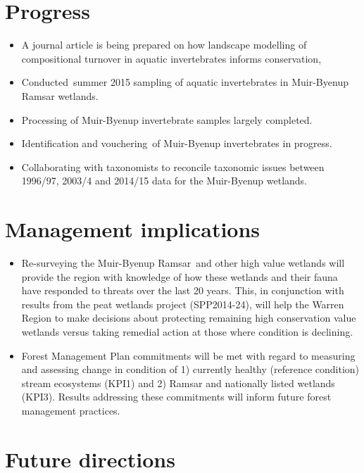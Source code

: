 \documentclass[version=last,
    paper=a4, %
    10pt, %
    usenames,
    dvipsnames,
    oneside, %
    headings=openany, %
    DIV=15 %
]{scrbook}
\begin{document}
\section*{Progress}

\begin{itemize}
\itemsep1pt\parskip0pt
\item
  A journal article is being prepared on how landscape modelling of
  compositional turnover in aquatic invertebrates informs conservation,
\item
  Conducted~summer 2015 sampling of aquatic invertebrates in Muir-Byenup
  Ramsar wetlands.
\item
  Processing of Muir-Byenup invertebrate samples largely completed.
\item
  Identification and vouchering~of Muir-Byenup invertebrates in
  progress.
\item
  Collaborating with taxonomists to reconcile taxonomic issues between
  1996/97, 2003/4 and 2014/15 data for the Muir-Byenup wetlands.
\end{itemize}




\section*{Management implications}

\begin{itemize}
\itemsep1pt\parskip0pt
\item
  Re-surveying the Muir-Byenup Ramsar~and other high value wetlands will
  provide the region with knowledge of how these wetlands and their
  fauna have responded to threats over the last 20 years. This, in
  conjunction with results from the peat wetlands project (SPP2014-24),
  will help the Warren Region to make decisions about protecting
  remaining high conservation value wetlands versus taking remedial
  action at those where condition is declining.
\item
  Forest Management Plan commitments will be met with regard to
  measuring and assessing change in condition of 1) currently healthy
  (reference condition) stream ecosystems (KPI1) and 2) Ramsar and
  nationally listed wetlands (KPI3). Results addressing these
  commitments will inform future forest management practices.
\end{itemize}




\section*{Future directions}
\end{document}

